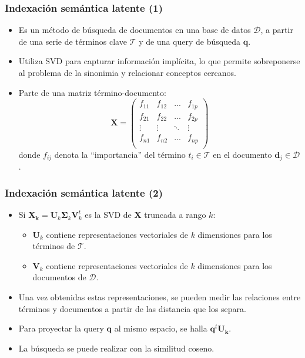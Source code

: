 \documentclass{beamer}
\begin{document}
\begin{frame}
\frametitle{Indexación semántica latente (1)}


\begin{itemize}
    \item Es un método de búsqueda de documentos en una base de datos $\mathcal{D}$, a partir de una serie de términos clave $\mathcal{T}$ y de una query de búsqueda $\boldsymbol{q}$.
    \item Utiliza SVD para capturar información implícita, lo que permite sobreponerse al problema de la sinonimia y relacionar conceptos cercanos.
    \item Parte de una matriz término-documento:
    \begin{equation*}
    \boldsymbol{X} = \begin{pmatrix}
    f_{11}   & f_{12}   & ...  & f_{1p}  \\
    f_{21}   & f_{22}   & ...  & f_{2p}   \\
    \vdots   & \vdots   & \ddots & \vdots \\
    f_{n1}   & f_{n2}   & ...  & f_{np}   \\
    \end{pmatrix}
    \end{equation*}
    \noindent donde $f_{ij}$ denota la ``importancia'' del término $t_i \in \mathcal{T}$ en el documento $\boldsymbol{d}_j \in \mathcal{D}$.
\end{itemize}

\end{frame}

\begin{frame}
\frametitle{Indexación semántica latente (2)}

\begin{itemize}
    \item Si $\boldsymbol{X_k} = \boldsymbol{U}_k \boldsymbol{\Sigma}_k \boldsymbol{V}_k^t$ es la SVD de $\boldsymbol{X}$ truncada a rango $k$:
    \begin{itemize}
        \item $\boldsymbol{U}_k$ contiene representaciones vectoriales de $k$ dimensiones para los términos de $\mathcal{T}$.
        \item $\boldsymbol{V}_k$ contiene representaciones vectoriales de $k$ dimensiones para los documentos de $\mathcal{D}$.
    \end{itemize}
    
    \item Una vez obtenidas estas representaciones, se pueden medir las relaciones entre términos y documentos a partir de las distancia que los separa.
    
    \item Para proyectar la query $\boldsymbol{q}$ al mismo espacio, se halla $\boldsymbol{q}^t\boldsymbol{U_k}$.
    
    \item La búsqueda se puede realizar con la similitud coseno.

    
\end{itemize}

\end{frame}
 
\end{document}
